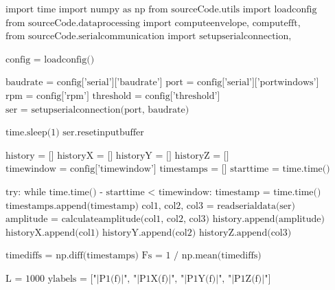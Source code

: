 \begin{algorithmic}[1]
	\STATE $\text{import time}$
	\STATE $\text{import numpy as np}$
	\STATE $\text{from sourceCode.utils import loadconfig}$
	\STATE $\text{from sourceCode.dataprocessing import computeenvelope, computefft, calculateamplitude, plotfft, unbalancing}$
	\STATE $\text{from sourceCode.serialcommunication import setupserialconnection, readserialdata}$
	
	\STATE
	\STATE $\text{config = loadconfig()}$
	
	\STATE
	\STATE $\text{baudrate = config['serial']['baudrate']}$
	\STATE $\text{port = config['serial']['portwindows']}$
	\STATE $\text{rpm = config['rpm']}$
	\STATE $\text{threshold = config['threshold']}$
	\STATE $\text{ser = setupserialconnection(port, baudrate)}$
	
	\STATE
	\STATE $\text{time.sleep(1)}$
	\STATE $\text{ser.resetinputbuffer}$
	
	\STATE
	\STATE $\text{history = []}$
	\STATE $\text{historyX = []}$
	\STATE $\text{historyY = []}$
	\STATE $\text{historyZ = []}$
	\STATE $\text{timewindow = config['timewindow']}$
	\STATE $\text{timestamps = []}$
	\STATE $\text{starttime = time.time()}$
	
	\STATE
	\STATE $\text{try:}$
	\STATE \hspace{0.5cm} $\text{while time.time() - starttime < timewindow:}$
	\STATE \hspace{1.0cm} $\text{timestamp = time.time()}$
	\STATE \hspace{1.0cm} $\text{timestamps.append(timestamp)}$
	\STATE \hspace{1.0cm} $\text{col1, col2, col3 = readserialdata(ser)}$
	\STATE \hspace{1.0cm} $\text{amplitude = calculateamplitude(col1, col2, col3)}$
	\STATE \hspace{1.0cm} $\text{history.append(amplitude)}$
	\STATE \hspace{1.0cm} $\text{historyX.append(col1)}$
	\STATE \hspace{1.0cm} $\text{historyY.append(col2)}$
	\STATE \hspace{1.0cm} $\text{historyZ.append(col3)}$
	
	\STATE
	\STATE \hspace{0.5cm} $\text{timediffs = np.diff(timestamps)}$
	\STATE \hspace{0.5cm} $\text{Fs = 1 / np.mean(timediffs)}$
	
	\STATE
	\STATE \hspace{0.5cm} $\text{L = 1000}$
	\STATE \hspace{0.5cm} $\text{ylabels = ["|P1(f)|", "|P1X(f)|", "|P1Y(f)|", "|P1Z(f)|"]}$
	

\end{algorithmic}

